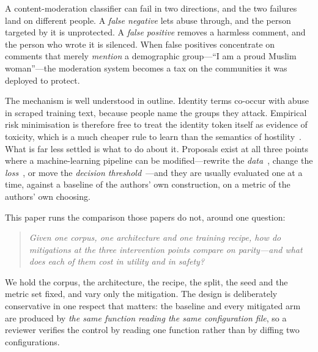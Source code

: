\documentclass[conference]{IEEEtran}
\begin{document}
A content-moderation classifier can fail in two directions, and the two failures
land on different people. A \emph{false negative} lets abuse through, and the
person targeted by it is unprotected. A \emph{false positive} removes a harmless
comment, and the person who wrote it is silenced. When false positives
concentrate on comments that merely \emph{mention} a demographic group---``I am a
proud Muslim woman''---the moderation system becomes a tax on the communities it
was deployed to protect.

The mechanism is well understood in outline. Identity terms co-occur with abuse
in scraped training text, because people name the groups they attack. Empirical
risk minimisation is therefore free to treat the identity token itself as
evidence of toxicity, which is a much cheaper rule to learn than the semantics of
hostility~\cite{dixon2018,borkan2019}. What is far less settled is what to do
about it. Proposals exist at all three points where a machine-learning pipeline
can be modified---rewrite the \emph{data}~\cite{dixon2018,park2018}, change the
\emph{loss}~\cite{sagawa2020,zhang2018}, or move the \emph{decision
threshold}~\cite{hardt2016}---and they are usually evaluated one at a time,
against a baseline of the authors' own construction, on a metric of the authors'
own choosing.

This paper runs the comparison those papers do not, around one question:

\begin{quote}
\emph{Given one corpus, one architecture and one training recipe, how do
mitigations at the three intervention points compare on parity---and what does
each of them cost in utility and in safety?}
\end{quote}

\noindent
We hold the corpus, the architecture, the recipe, the split, the seed and the
metric set fixed, and vary only the mitigation. The design is deliberately
conservative in one respect that matters: the baseline and every mitigated arm
are produced by \emph{the same function reading the same configuration file}, so
a reviewer verifies the control by reading one function rather than by diffing
two configurations.
\end{document}
